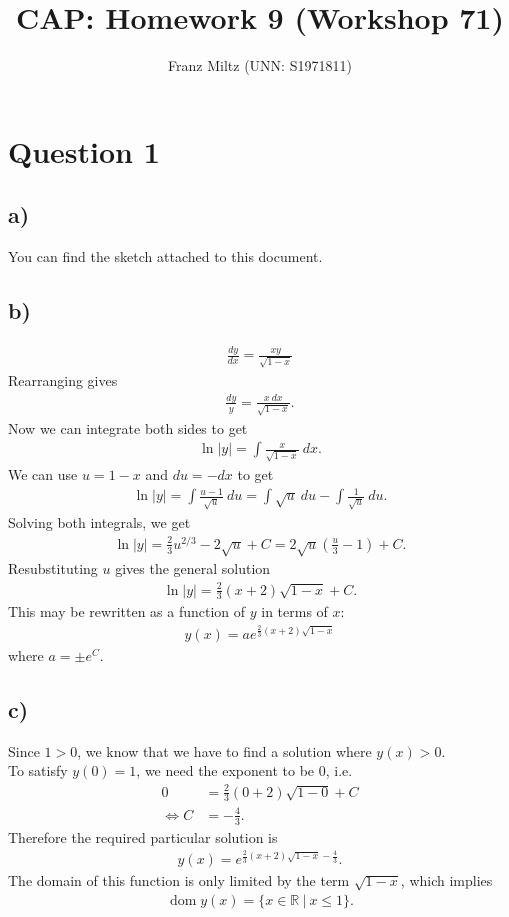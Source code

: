 \documentclass{article}
\title{CAP: Homework 9 (Workshop 71)}
\author{Franz Miltz (UNN: S1971811)}
\DeclareMathOperator{\dom}{dom}
\newcommand{\R}{\mathbb{R}}
\begin{document}
\maketitle
\section*{Question 1}
\subsection*{a)}
You can find the sketch attached to this document.
\subsection*{b)}
\begin{align*}
  \frac{dy}{dx}=\frac{xy}{\sqrt{1-x}}
\end{align*}
Rearranging gives
\begin{align*}
  \frac{dy}{y}=\frac{x\:dx}{\sqrt{1-x}}.
\end{align*}
Now we can integrate both sides to get
\begin{align*}
  \ln|y| = \int \frac{x}{\sqrt{1-x}}\:dx.
\end{align*}
We can use $u=1-x$ and $du=-dx$ to get
\begin{align*}
  \ln|y| = \int \frac{u-1}{\sqrt{u}}\:du=\int \sqrt{u}\:du - \int \frac{1}{\sqrt{u}}\:du.
\end{align*}
Solving both integrals, we get
\begin{align*}
  \ln|y|=\frac{2}{3}u^{2/3}-2\sqrt{u}+C=2\sqrt{u}\left(\frac{u}{3}-1\right)+C.
\end{align*}
Resubstituting $u$ gives the general solution
\begin{align*}
  \ln|y|=\frac{2}{3}(x+2)\sqrt{1-x}+C.
\end{align*}
This may be rewritten as a function of $y$ in terms of $x$:
\begin{align*}
  y(x)=  ae^{\frac{2}{3}(x+2)\sqrt{1-x}}
\end{align*}
where $a=\pm e^C$.
\subsection*{c)}
Since $1>0$, we know that we have to find a solution where $y(x)>0$.\\
To satisfy $y(0)=1$, we need the exponent to be $0$, i.e.
\begin{align*}
  0&=\frac{2}{3}(0+2)\sqrt{1-0}+C\\
  \Leftrightarrow C &= -\frac{4}{3}.
\end{align*}
Therefore the required particular solution is
\begin{align*}
  y(x)=e^{\frac{2}{3}(x+2)\sqrt{1-x}-\frac{4}{3}}.
\end{align*}
The domain of this function is only limited by the term $\sqrt{1-x}$, which implies \begin{align*}
  \dom y(x) = \{x\in\R\:|\: x\leq 1\}.
\end{align*}
\end{document}
